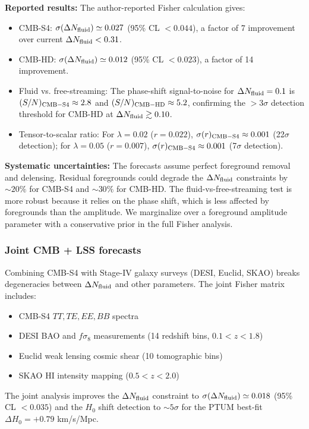\documentclass[epj]{svjour}
\begin{document}
\textbf{Reported results:} The author-reported Fisher calculation gives:
\begin{itemize}
\item CMB-S4: \(\sigma(\Delta N_{\rm fluid}) \simeq 0.027\) (95\% CL
      \(< 0.044\)), a factor of 7 improvement over current
      \(\Delta N_{\rm fluid} < 0.31\).
\item CMB-HD: \(\sigma(\Delta N_{\rm fluid}) \simeq 0.012\) (95\% CL
      \(< 0.023\)), a factor of 14 improvement.
\item Fluid vs. free-streaming: The phase-shift signal-to-noise
      for \(\Delta N_{\rm fluid} = 0.1\) is \((S/N)_{\rm CMB-S4}
      \approx 2.8\) and \((S/N)_{\rm CMB-HD} \approx 5.2\),
      confirming the \(>3\sigma\) detection threshold for CMB-HD
      at \(\Delta N_{\rm fluid} \gtrsim 0.10\).
\item Tensor-to-scalar ratio: For \(\lambda = 0.02\) (\(r=0.022\)),
      \(\sigma(r)_{\rm CMB-S4} \approx 0.001\) (22\(\sigma\)
      detection); for \(\lambda = 0.05\) (\(r=0.007\)),
      \(\sigma(r)_{\rm CMB-S4} \approx 0.001\) (7\(\sigma\)
      detection).
\end{itemize}

\textbf{Systematic uncertainties:} The forecasts assume perfect
foreground removal and delensing. Residual foregrounds could
degrade the \(\Delta N_{\rm fluid}\) constraints by \(\sim 20\%\)
for CMB-S4 and \(\sim 30\%\) for CMB-HD. The fluid-vs-free-streaming
test is more robust because it relies on the phase shift, which is
less affected by foregrounds than the amplitude. We marginalize
over a foreground amplitude parameter with a conservative prior in
the full Fisher analysis.

\subsubsection{Joint CMB + LSS forecasts}
\label{sec:forecast_joint}

Combining CMB-S4 with Stage-IV galaxy surveys (DESI, Euclid, SKAO)
breaks degeneracies between \(\Delta N_{\rm fluid}\) and other
parameters. The joint Fisher matrix includes:
\begin{itemize}
\item CMB-S4 \(TT, TE, EE, BB\) spectra
\item DESI BAO and \(f\sigma_8\) measurements (14 redshift bins,
      \(0.1 < z < 1.8\))
\item Euclid weak lensing cosmic shear (10 tomographic bins)
\item SKAO HI intensity mapping (\(0.5 < z < 2.0\))
\end{itemize}
The joint analysis improves the \(\Delta N_{\rm fluid}\) constraint
to \(\sigma(\Delta N_{\rm fluid}) \simeq 0.018\) (95\% CL \(< 0.035\))
and the \(H_0\) shift detection to \(\sim 5\sigma\) for the PTUM
best-fit \(\Delta H_0 = +0.79\) km/s/Mpc.
\end{document}
